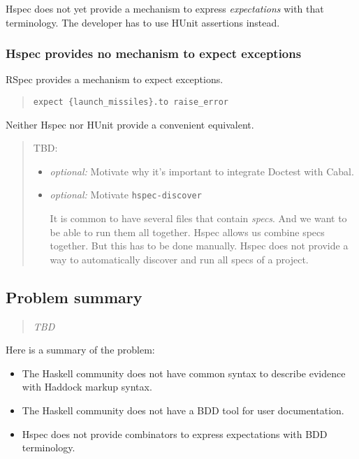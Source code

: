 \documentclass[preprint]{sigplanconf}
\begin{document}
\noindent Hspec does not yet provide a mechanism to express
\emph{expectations} with that terminology.  The developer has to use
HUnit assertions instead.

\subsubsection{Hspec provides no mechanism to expect exceptions}
RSpec provides a mechanism to expect exceptions.

\begin{quote}\small\begin{verbatim}
expect {launch_missiles}.to raise_error
\end{verbatim}\end{quote}

\noindent Neither Hspec nor HUnit provide a convenient equivalent.


\begin{quote}
    TBD:
\begin{itemize}
    \item \emph{optional:} Motivate why it's important to integrate
        Doctest with
        Cabal.

    \item \emph{optional:} Motivate \verb|hspec-discover|

        It is common to have several files that contain \emph{specs}.
        And we want to be able to run them all together.  Hspec allows
        us combine specs together.  But this has to be done manually.
        Hspec does not provide a way to automatically discover and run
        all specs of a project.
\end{itemize}
\end{quote}

\subsection{Problem summary}


\begin{quote}
    \emph{TBD}
\end{quote}

Here is a summary of the problem:

\begin{itemize}
\item
    The Haskell community does not have common syntax to describe
    evidence with Haddock markup syntax.
\item
    The Haskell community does not have a BDD tool for user documentation.
\item
    Hspec does not provide combinators to express expectations with
    BDD terminology.
\end{itemize}
\end{document}

